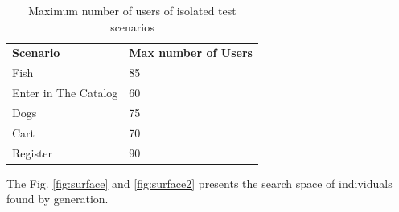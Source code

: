 \begin{table}[h!]
\centering
\caption{Maximum number of users of isolated test scenarios }
\label{tab:isolated}
\begin{tabular}{ll}
\rowcolor[HTML]{FFCCC9} 
\textbf{Scenario}    & \textbf{Max number of Users} \\
Fish                 & 85                           \\
Enter in The Catalog & 60                           \\
Dogs                 & 75                           \\
Cart                 & 70                           \\
Register             & 90                          
\end{tabular}
\end{table}

The Fig. \ref{fig:surface} and \ref{fig:surface2} presents the search space of individuals found by generation.


